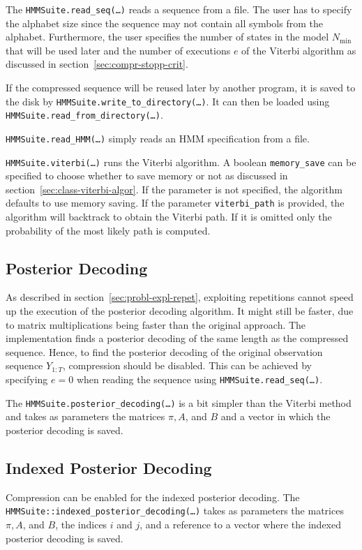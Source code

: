The \texttt{HMMSuite.read\_seq(\dots)} reads a sequence from a file. The user
has to specify the alphabet size since the sequence may not contain all
symbols from the alphabet. Furthermore, the user specifies the number of states
in the model $N_{\min}$ that will be used later and the number of executions
$e$ of the Viterbi algorithm as discussed in
section~\ref{sec:compr-stopp-crit}.

If the compressed sequence will be reused later by another program, it is saved
to the disk by \texttt{HMMSuite.write\_to\_directory(\dots)}. It can then be
loaded using \texttt{HMMSuite.read\_from\_directory(\dots)}.

\texttt{HMMSuite.read\_HMM(\dots)} simply reads an HMM specification from a
file.

\texttt{HMMSuite.viterbi(\dots)} runs the Viterbi algorithm. A boolean
\texttt{me\-mo\-ry\_\-save} can be specified to choose whether to save memory or not
as discussed in section~\ref{sec:class-viterbi-algor}. If the parameter is not
specified, the algorithm defaults to use memory saving. If the parameter
\texttt{viterbi\_path} is provided, the algorithm will backtrack to obtain the
Viterbi path. If it is omitted only the probability of the most likely path is
computed.

\subsection{Posterior Decoding}

As described in section~\ref{sec:probl-expl-repet}, exploiting repetitions
cannot speed up the execution of the posterior decoding algorithm. It might still
be faster, due to matrix multiplications being faster than the original
approach. The implementation finds a posterior decoding of the same length as
the compressed sequence. Hence, to find the posterior decoding of the original
observation sequence $Y_{1:T}$, compression should be disabled. This can be achieved by
specifying $e = 0$ when reading the sequence using
\texttt{HMMSuite.read\_seq(\dots)}.

The \texttt{HMMSuite.posterior\_decoding(\dots)} is a bit simpler than the
Viterbi method and takes as parameters the matrices $\pi, A$, and $B$ and a
vector in which the posterior decoding is saved.

\subsection{Indexed Posterior Decoding}

Compression can be enabled for the indexed posterior decoding. The
\texttt{HMMSuite::indexed\_posterior\_decoding(\dots)} takes as parameters the
matrices $\pi, A$, and $B$, the indices $i$ and $j$, and a reference to a vector
where the indexed posterior decoding is saved.

